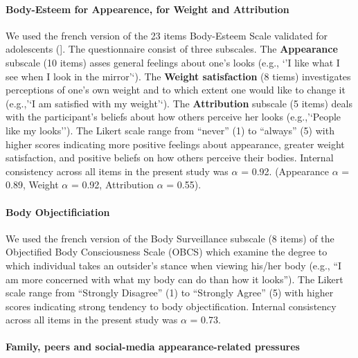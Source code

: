 \documentclass[preprint, 3p,
authoryear]{elsarticle} %
\begin{document}
\hypertarget{body-esteem-for-appearence-for-weight-and-attribution}{%
\paragraph{Body-Esteem for Appearence, for Weight and
Attribution}\label{body-esteem-for-appearence-for-weight-and-attribution}}

We used the french version \citep{valls_etude_2011} of the 23 items
Body-Esteem Scale validated for adolescents
(\citet{mendelson_body-esteem_2001}{]}. The questionnaire consist of
three subscales. The \textbf{Appearance} subscale (10 items) asses
general feelings about one's looks (e.g., `'I like what I see when I
look in the mirror'`). The \textbf{Weight satisfaction} (8 tiems)
investigates perceptions of one's own weight and to which extent one
would like to change it (e.g.,'`I am satisfied with my weight'`). The
\textbf{Attribution} subscale (5 items) deals with the participant's
beliefs about how others perceive her looks (e.g.,'`People like my
looks''). The Likert scale range from ``never'' (1) to ``always'' (5)
with higher scores indicating more positive feelings about appearance,
greater weight satisfaction, and positive beliefs on how others perceive
their bodies. Internal consistency across all items in the present study
was \(\alpha\) = 0.92. (Appearance \(\alpha\) = 0.89, Weight \(\alpha\)
= 0.92, Attribution \(\alpha\) = 0.55).

\hypertarget{body-objectificiation}{%
\paragraph{Body Objectificiation}\label{body-objectificiation}}

We used the french version \citep{wollast_how_2019} of the Body
Surveillance subscale (8 items) of the Objectified Body Consciousness
Scale (OBCS)\citep{mckinley_objectified_1996} which examine the degree
to which individual takes an outsider's stance when viewing his/her body
(e.g., ``I am more concerned with what my body can do than how it
looks''). The Likert scale range from ``Strongly Disagree'' (1) to
``Strongly Agree'' (5) with higher scores indicating strong tendency to
body objectification. Internal consistency across all items in the
present study was \(\alpha\) = 0.73.

\hypertarget{family-peers-and-social-media-appearance-related-pressures}{%
\paragraph{Family, peers and social-media appearance-related
pressures}\label{family-peers-and-social-media-appearance-related-pressures}}
\end{document}
